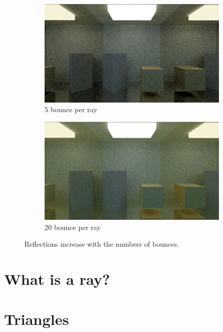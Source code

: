 \documentclass[titlepage,12pt]{report}
\begin{document}
\begin{figure}[H]
	\medskip	
	\begin{subfigure}{.48\textwidth}
		\centering
		\includegraphics[scale=0.315]{media/mirrors_rect/cornell_mirrors_5.png}
		\caption{5 bounce per ray}
		\label{mr_rect_5}
	\end{subfigure}
	\begin{subfigure}{.48\textwidth}
		\centering
		\includegraphics[scale=0.315]{media/mirrors_rect/cornell_mirrors_20.png}	
		\caption{20 bounce per ray}
		\label{mr_rect_20}
	\end{subfigure}
	\caption{Reflections increase with the numbers of bounces.}
	\label{bounces}
\end{figure}


\section{What is a ray?}

\section{Triangles}
\end{document}
